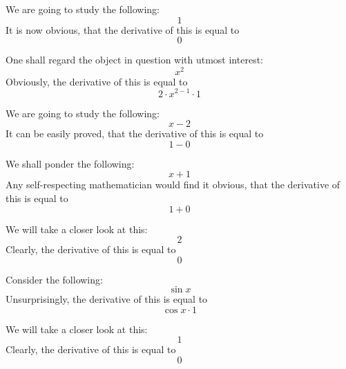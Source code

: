 \documentclass{article}
\begin{document}
We are going to study the following:
\begin{equation}
1 
\end{equation}
It is now obvious, that the derivative of this is equal to
\begin{equation}
0 
\end{equation}

One shall regard the object in question with utmost interest:
\begin{equation}
x ^{2 } 
\end{equation}
Obviously, the derivative of this is equal to
\begin{equation}
2 \cdot x ^{2 - 1 } \cdot 1 
\end{equation}

We are going to study the following:
\begin{equation}
x - 2 
\end{equation}
It can be easily proved, that the derivative of this is equal to
\begin{equation}
1 - 0 
\end{equation}

We shall ponder the following:
\begin{equation}
x + 1 
\end{equation}
Any self-respecting mathematician would find it obvious, that the derivative of this is equal to
\begin{equation}
1 + 0 
\end{equation}

We will take a closer look at this:
\begin{equation}
2 
\end{equation}
Clearly, the derivative of this is equal to
\begin{equation}
0 
\end{equation}

Consider the following:
\begin{equation}
\sin x 
\end{equation}
Unsurprisingly, the derivative of this is equal to
\begin{equation}
\cos x \cdot 1 
\end{equation}

We will take a closer look at this:
\begin{equation}
1 
\end{equation}
Clearly, the derivative of this is equal to
\begin{equation}
0 
\end{equation}
\end{document}
